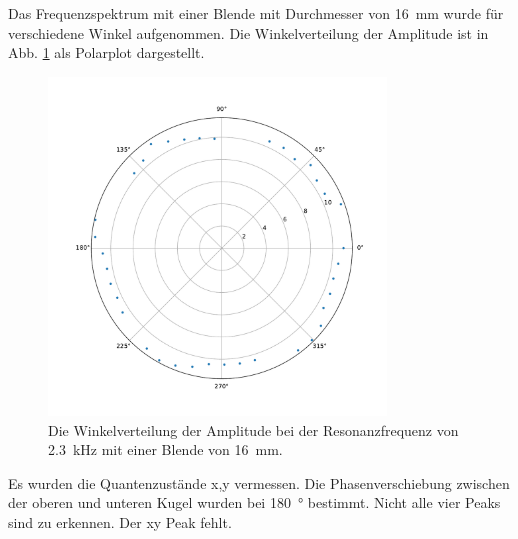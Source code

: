 Das Frequenzspektrum mit einer Blende mit Durchmesser von \SI{16}{\milli\metre} wurde für verschiedene Winkel aufgenommen. Die Winkelverteilung der Amplitude ist in Abb. \ref{fig:polar_molekuel} als Polarplot dargestellt. 

\begin{figure}
    \centering
    \includegraphics[width=0.8\textwidth]{plots/D_3.pdf}
    \caption{Die Winkelverteilung der Amplitude bei der Resonanzfrequenz von \SI{2.3}{\kilo\hertz} mit einer Blende von \SI{16}{\milli\metre}.}
    \label{fig:polar_molekuel}
\end{figure}

Es wurden die Quantenzustände x,y vermessen. 
Die Phasenverschiebung zwischen der oberen und unteren Kugel wurden bei \SI{180}{\degree} bestimmt. 
Nicht alle vier Peaks sind zu erkennen. Der xy Peak fehlt.